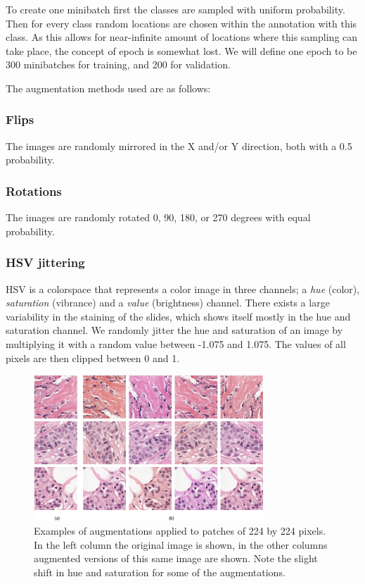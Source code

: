 \documentclass[journal]{IEEEtran}
\begin{document}
To create one minibatch first the classes are sampled with uniform probability. Then for every class random locations are chosen within the annotation with this class. As this allows for near-infinite amount of locations where this sampling can take place, the concept of epoch is somewhat lost. We will define one epoch to be 300 minibatches for training, and 200 for validation. 

\medskip

The augmentation methods used are as follows:

\subsubsection{Flips}
The images are randomly mirrored in the X and/or Y direction, both with a 0.5 probability. 

\subsubsection{Rotations}
The images are randomly rotated 0, 90, 180, or 270 degrees with equal probability.

\subsubsection{HSV jittering}
HSV is a colorspace that represents a color image in three channels; a \emph{hue} (color), \emph{saturation} (vibrance) and a \emph{value} (brightness) channel. There exists a large variability in the staining of the slides, which shows itself mostly in the hue and saturation channel. We randomly jitter the hue and saturation of an image by multiplying it with a random value between -1.075 and 1.075. The values of all pixels are then clipped between 0 and 1.

\begin{figure}[!t]
\centering{}
\includegraphics[width=3.4in]{augment_examples}
\caption{Examples of augmentations applied to patches of 224 by 224 pixels. In the left column the original image is shown, in the other columns augmented versions of this same image are shown. Note the slight shift in hue and saturation for some of the augmentations.}
\label{fig_augment}
\end{figure}
\end{document}
